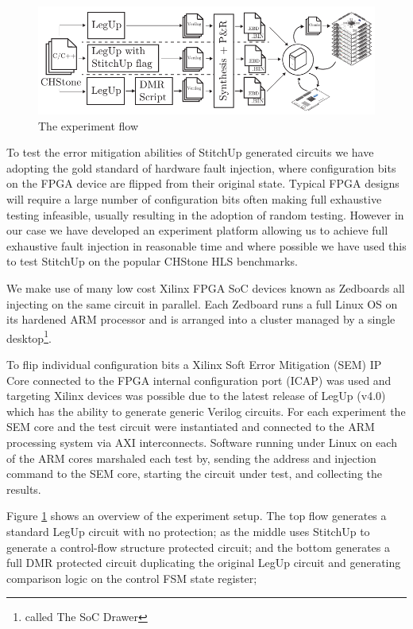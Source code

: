 \begin{figure}[t]
\centering
\includegraphics[width=6in]{./imgs/ExperimentFlow.pdf}
\caption{The experiment flow}
\label{fig:ExperimentFlow}
\end{figure}

To test the error mitigation abilities of StitchUp generated circuits we have adopting the
gold standard of hardware fault injection, where configuration bits on the 
FPGA device are flipped from their original state.
Typical FPGA designs will require a large number of configuration bits often making
full exhaustive testing infeasible, usually resulting in the adoption of random
testing.
However in our case we have developed an experiment
platform allowing us to achieve full exhaustive fault injection in reasonable time
and where possible we have used this to test StitchUp on the popular CHStone 
HLS benchmarks.

We make use of many low cost Xilinx FPGA SoC devices known as
Zedboards all injecting on the same circuit in parallel.
Each Zedboard runs a full Linux OS on its hardened ARM processor and is arranged into
a cluster managed by a single desktop\footnote{called The SoC Drawer}.

To flip individual configuration bits a Xilinx Soft Error Mitigation (SEM) IP Core
connected to the FPGA internal configuration port (ICAP) was used and
targeting Xilinx devices was possible due to the latest release of LegUp
(v4.0) which has the ability to generate generic Verilog circuits.
For each experiment the SEM core and the test circuit were instantiated and connected to the
ARM processing system via AXI interconnects.
Software running under Linux on each of the ARM cores marshaled each test by, sending the
address and injection command to the SEM core, starting the circuit under test, and
collecting the results.

Figure \ref{fig:ExperimentFlow} shows an overview of the experiment setup.
The top flow generates a standard LegUp circuit with no protection;
as the middle uses StitchUp to generate a control-flow structure protected circuit;
and the bottom generates a full DMR protected circuit duplicating the original LegUp
circuit and generating comparison logic on the control FSM state register;

